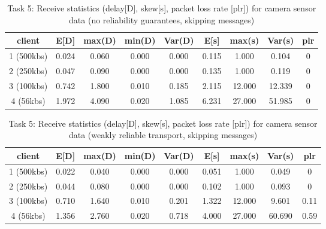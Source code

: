 \begin{table}
\centering
\begin{tabular}{|c|c|c|c|c|c|c|c|c|}
\hline
client & E[D] & max(D) & min(D) & Var(D) & E[s] & max(s) & Var(s) & plr\\
\hline
1 (500kbs) & 0.024 & 0.060 & 0.000 & 0.000 & 0.115 & 1.000 & 0.104 & 0\\
\hline
2 (250kbs) & 0.047 & 0.090 & 0.000 & 0.000 & 0.135 & 1.000 & 0.119 & 0\\
\hline
3 (100kbs) & 0.742 & 1.800 & 0.010 & 0.185 & 2.115 & 12.000 & 12.339 & 0 \\
\hline
4 (56kbs) & 1.972 & 4.090 & 0.020 & 1.085 & 6.231 & 27.000 & 51.985 & 0 \\
\hline
\end{tabular}
\caption{Task 5: Receive statistics (delay[D], skew[s], packet loss rate [plr]) for camera sensor data (no reliability guarantees, skipping messages)}
\label{table:task5-camera-c}
\end{table}


\begin{table}
\centering
\begin{tabular}{|c|c|c|c|c|c|c|c|c|}
\hline
client & E[D] & max(D) & min(D) & Var(D) & E[s] & max(s) & Var(s) & plr\\
\hline
1 (500kbs) & 0.022 & 0.040 & 0.000 & 0.000 & 0.051 & 1.000 & 0.049 & 0\\
\hline
2 (250kbs) & 0.044 & 0.080 & 0.000 & 0.000 & 0.102 & 1.000 & 0.093 & 0\\
\hline
3 (100kbs) & 0.710 & 1.640 & 0.010 & 0.201 & 1.322 & 12.000 & 9.601 & 0.11\\
\hline
4 (56kbs) & 1.356 & 2.760 & 0.020 & 0.718 & 4.000 & 27.000 & 60.690 & 0.59\\
\hline
\end{tabular}
\caption{Task 5: Receive statistics (delay[D], skew[s], packet loss rate [plr]) for camera sensor data (weakly reliable transport, skipping messages)}
\label{table:task5-camera-d}
\end{table}

